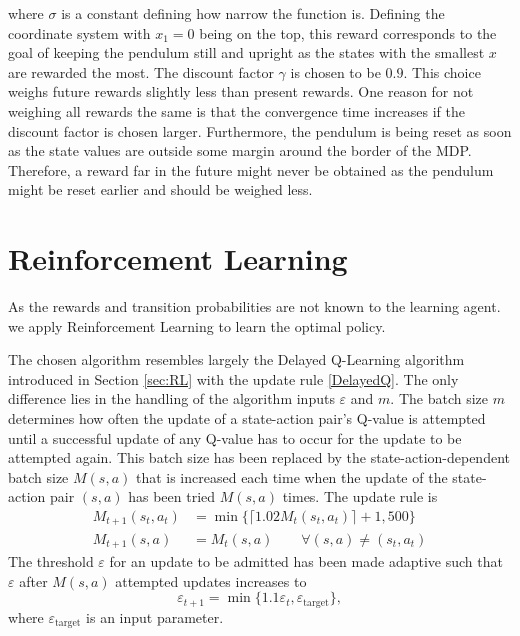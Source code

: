 \documentclass[../main.tex]{subfiles}
\begin{document}
where $\sigma$ is a constant defining how narrow the function is. Defining the coordinate system with $x_1 = 0$ being on the top, this reward corresponds to the goal of keeping the pendulum still and upright as the states with the smallest $x$ are rewarded the most. The discount factor $\gamma$ is chosen to be $0.9$. This choice weighs future rewards slightly less than present rewards. One reason for not weighing all rewards the same is that the convergence time increases if the discount factor is chosen larger. Furthermore, the pendulum is being reset as soon as the state values are outside some margin around the border of the MDP. Therefore, a reward far in the future might never be obtained as the pendulum might be reset earlier and should be weighed less.
\section{Reinforcement Learning}
As the rewards and transition probabilities are not known to the learning agent. we apply Reinforcement Learning to learn the optimal policy. 

The chosen algorithm resembles largely the Delayed Q-Learning algorithm introduced in Section \ref{sec:RL} with the update rule \eqref{DelayedQ}. The only difference lies in the handling of the algorithm inputs $\varepsilon$ and $m$. The batch size $m$ determines how often the update of a state-action pair's Q-value is attempted until a successful update of any Q-value has to occur for the update to be attempted again. This batch size has been replaced by the state-action-dependent batch size $M(s,a)$ that is increased each time when the update of the state-action pair $(s,a)$ has been tried $M(s,a)$ times. The update rule is 
\begin{align}
    M_{t+1}(s_t,a_t) &= \min\{\lceil1.02M_t(s_t,a_t)\rceil+1, 500\}\\
    M_{t+1}(s,a) &= M_t(s,a) \qquad \forall (s,a) \neq (s_t,a_t)
\end{align}
The threshold $\varepsilon$ for an update to be admitted has been made adaptive such that $\varepsilon$ after $M(s,a)$ attempted updates increases to 
\begin{equation}
    \varepsilon_{t+1} = \min\{1.1 \varepsilon_t, \varepsilon_{\text{target}}\}, 
\end{equation}
where $\varepsilon_{\text{target}}$ is an input parameter.
\end{document}
